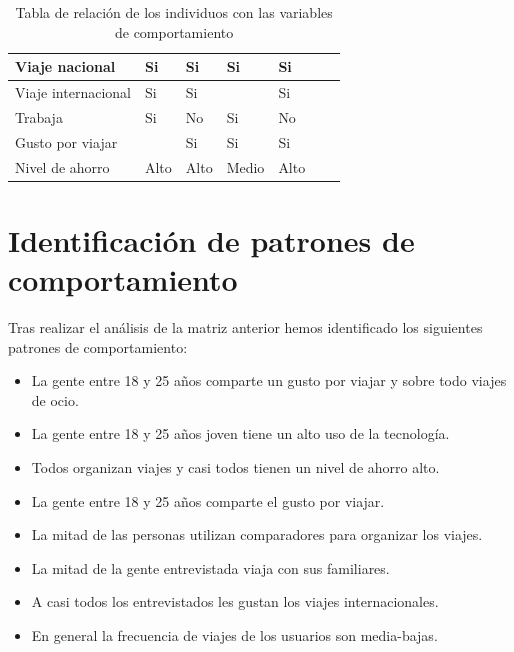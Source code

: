 \begin{table}[H]
\begin{tabular}{l|l|l|l|l|l|l|}
        \multicolumn{1}{|l|}{Viaje nacional}                    & Si          & Si                             & Si                 & Si                              \\ \hline
        \multicolumn{1}{|l|}{Viaje internacional}               & Si          & Si                             &                    & Si                              \\ \hline
        \multicolumn{1}{|l|}{Trabaja}                           & Si          & No                             & Si                 & No                              \\ \hline
        \multicolumn{1}{|l|}{Gusto por viajar}                  &             & Si                             & Si                 & Si                              \\ \hline
        \multicolumn{1}{|l|}{Nivel de ahorro}                   & Alto        & Alto                           & Medio              & Alto                            \\ \hline
    \end{tabular}
    \caption{Tabla de relación de los individuos con las variables de comportamiento}
    \label{table:relacion-individuos-variables}
\end{table}

\section{Identificación de patrones de comportamiento}
Tras realizar el análisis de la matriz anterior hemos identificado los siguientes patrones de comportamiento:
\begin{itemize}
    \item La gente entre 18 y 25 años comparte un gusto por viajar y sobre todo viajes de ocio.
    \item La gente entre 18 y 25 años joven tiene un alto uso de la tecnología.
    \item Todos organizan viajes y casi todos tienen un nivel de ahorro alto. 
    \item La gente entre 18 y 25 años comparte el gusto por viajar.
    \item La mitad de las personas utilizan comparadores para organizar los viajes.
    \item La mitad de la gente entrevistada viaja con sus familiares.
    \item A casi todos los entrevistados les gustan los viajes internacionales.
    \item En general la frecuencia de viajes de los usuarios son media-bajas.
\end{itemize}

